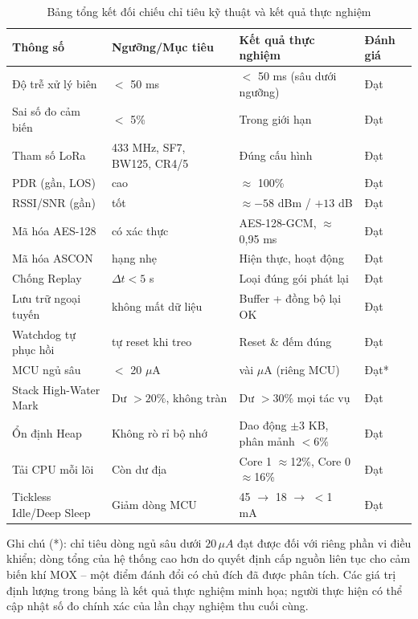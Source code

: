 \begin{table}[H]
\centering
\caption{Bảng tổng kết đối chiếu chỉ tiêu kỹ thuật và kết quả thực nghiệm}
\label{Bảng 5.7}
\renewcommand{\arraystretch}{1.4}
\small
\begin{tabular}{p{3.6cm} p{3.6cm} p{3.6cm} p{1.6cm}}
\hline
\textbf{Thông số} & \textbf{Ngưỡng/Mục tiêu} & \textbf{Kết quả thực nghiệm} & \textbf{Đánh giá} \\ \hline
Độ trễ xử lý biên & $<$ 50 ms & $<$ 50 ms (sâu dưới ngưỡng) & Đạt \\
Sai số đo cảm biến & $<$ 5\% & Trong giới hạn & Đạt \\ 
Tham số LoRa & 433 MHz, SF7, BW125, CR4/5 & Đúng cấu hình & Đạt \\
PDR (gần, LOS) & cao & $\approx$ 100\% & Đạt \\ 
RSSI/SNR (gần) & tốt & $\approx -58$ dBm / $+13$ dB & Đạt \\ 
Mã hóa AES-128 & có xác thực & AES-128-GCM, $\approx$ 0,95 ms & Đạt \\ 
Mã hóa ASCON & hạng nhẹ & Hiện thực, hoạt động & Đạt \\ 
Chống Replay & $\Delta t < 5$ s & Loại đúng gói phát lại & Đạt \\ 
Lưu trữ ngoại tuyến & không mất dữ liệu & Buffer + đồng bộ lại OK & Đạt \\
Watchdog tự phục hồi & tự reset khi treo & Reset \& đếm đúng & Đạt \\ 
MCU ngủ sâu & $<$ 20 $\mu$A & vài $\mu$A (riêng MCU) & Đạt* \\ 
Stack High-Water Mark & Dư $> 20\%$, không tràn & Dư $> 30\%$ mọi tác vụ & Đạt \\
Ổn định Heap & Không rò rỉ bộ nhớ & Dao động $\pm 3$ KB, phân mảnh $< 6\%$ & Đạt \\ 
Tải CPU mỗi lõi & Còn dư địa & Core 1 $\approx$12\%, Core 0 $\approx$16\% & Đạt \\ 
Tickless Idle/Deep Sleep & Giảm dòng MCU & 45 $\to$ 18 $\to$ $<$1 mA & Đạt \\ \hline
\end{tabular}
\end{table}

Ghi chú (*): chỉ tiêu dòng ngủ sâu dưới $20\,\mu A$ đạt được đối với riêng phần vi điều khiển; dòng tổng của hệ thống cao hơn do quyết định cấp nguồn liên tục cho cảm biến khí MOX -- một điểm đánh đổi có chủ đích đã được phân tích. Các giá trị định lượng trong bảng là kết quả thực nghiệm minh họa; người thực hiện có thể cập nhật số đo chính xác của lần chạy nghiệm thu cuối cùng.

